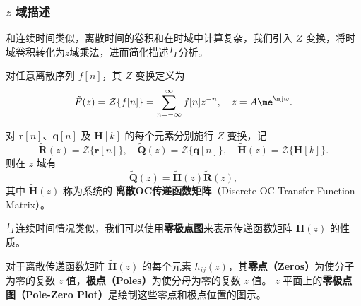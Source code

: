 \subsubsection{\texorpdfstring{$z$}{z} 域描述}
和连续时间类似，离散时间的卷积和在时域中计算复杂，我们引入 $Z$ 变换，将时域卷积转化为\(z\)域乘法，进而简化描述与分析。

\begin{definition}[$Z$ 变换]
    对任意离散序列 $f[n]$，其 \(Z\) 变换定义为
    \begin{equation}
        \tilde{F}(z)=\mathcal{Z}\{f[n]\}=\sum_{n=-\infty}^{\infty}f[n]z^{-n},\quad z=A\me^{\mj\omega}.
    \end{equation}
\end{definition}

\begin{theorem}
    对 $\mathbf{r}[n]$、$\mathbf{q}[n]$ 及 $\mathbf{H}[k]$ 的每个元素分别施行 $Z$ 变换，记
    \begin{equation}
        \tilde{\mathbf{R}}(z)=\mathcal{Z}\{\mathbf{r}[n]\},\quad
        \tilde{\mathbf{Q}}(z)=\mathcal{Z}\{\mathbf{q}[n]\},\quad
        \tilde{\mathbf{H}}(z)=\mathcal{Z}\{\mathbf{H}[k]\}.
    \end{equation}
    则在 $z$ 域有
    \begin{equation}
        \tilde{\mathbf{Q}}(z)=\tilde{\mathbf{H}}(z)\tilde{\mathbf{R}}(z),
    \end{equation}
    其中 $\tilde{\mathbf{H}}(z)$ 称为系统的 \textbf{离散OC传递函数矩阵}（Discrete OC Transfer-Function Matrix）。
\end{theorem}

与连续时间情况类似，我们可以使用\textbf{零极点图}来表示传递函数矩阵 $\tilde{\mathbf{H}}(z)$ 的性质。
\begin{definition}[零极点图（$z$ 域）]
    对于离散传递函数矩阵 $\tilde{\mathbf{H}}(z)$ 的每个元素 $h_{ij}(z)$，其\textbf{零点（Zeros）}为使分子为零的复数 $z$ 值，\textbf{极点（Poles）}为使分母为零的复数 $z$ 值。
    $z$ 平面上的\textbf{零极点图（Pole-Zero Plot）}是绘制这些零点和极点位置的图示。
\end{definition}


